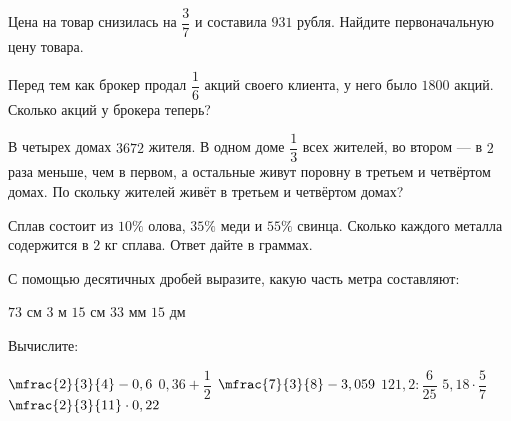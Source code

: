 \begin{homework}[number=1]
	\begin{listofex}
		\item Цена на товар снизилась на \(\dfrac{3}{7}\) и составила \(931\) рубля. Найдите первоначальную цену товара.
		\item Перед тем как брокер продал \( \dfrac{1}{6} \) акций своего клиента, у него было \(1800\) акций. Сколько акций у брокера теперь?
		\item В четырех домах \(3672\) жителя. В одном доме \(\dfrac{1}{3}\) всех жителей, во втором --- в \(2\) раза меньше, чем в первом, а остальные живут поровну в третьем и четвёртом домах. По скольку жителей живёт в третьем и четвёртом домах?
		\item Сплав состоит из \(10 \%\) олова, \(35\%\) меди и \(55\%\) свинца. Сколько каждого металла содержится в \(2\) кг сплава. Ответ дайте в граммах.
		\item С помощью десятичных дробей выразите, какую часть метра составляют:
		\begin{itasks}[4]
			\task \(73\) см
			\task \(3\) м \(15\) см
			\task \(33\) мм
			\task \(15\) дм
		\end{itasks}
		\item Вычислите:
		\begin{itasks}[3]
			\task \(\mfrac{2}{3}{4}-0,6\) 
			\task \( 0,36+\dfrac{1}{2} \)
			\task \(\mfrac{7}{3}{8}-3,059\)
			\task \(121,2:\dfrac{6}{25}\)
			\task \( 5,18 \cdot \dfrac{5}{7} \) 
			\task \( \mfrac{2}{3}{11} \cdot 0,22 \)
		\end{itasks}
	\end{listofex}
\end{homework}

